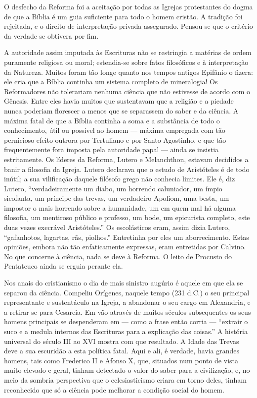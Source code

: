 \documentclass[11pt,a5paper,twoside,openany]{book}
\begin{document}
O desfecho da Reforma foi a aceitação por todas as Igrejas protestantes do dogma de que a Bíblia é um guia suficiente para todo o homem cristão. A tradição foi rejeitada, e o direito de interpretação privada assegurado. Pensou-se que o critério da verdade se obtivera por fim.

A autoridade assim imputada às Escrituras não se restringia a matérias de ordem puramente religiosa ou moral; estendia-se sobre fatos filosóficos e à interpretação da Natureza. Muitos foram tão longe quanto nos tempos antigos Epifânio o fizera: ele cria que a Bíblia continha um sistema completo de mineralogia! Os Reformadores não tolerariam nenhuma ciência que não estivesse de acordo com o Gênesis. Entre eles havia muitos que sustentavam que a religião e a piedade nunca poderiam florescer a menos que se separassem do saber e da ciência. A máxima fatal de que a Bíblia continha a soma e a substância de todo o conhecimento, útil ou possível ao homem — máxima empregada com tão pernicioso efeito outrora por Tertuliano e por Santo Agostinho, e que tão frequentemente fora imposta pela autoridade papal — ainda se insistia estritamente. Os líderes da Reforma, Lutero e Melanchthon, estavam decididos a banir a filosofia da Igreja. Lutero declarava que o estudo de Aristóteles é de todo inútil; a sua vilificação daquele filósofo grego não conhecia limites. Ele é, diz Lutero, “verdadeiramente um diabo, um horrendo caluniador, um ímpio sicofanta, um príncipe das trevas, um verdadeiro Apoliom, uma besta, um impostor o mais horrendo sobre a humanidade, um em quem mal há alguma filosofia, um mentiroso público e professo, um bode, um epicurista completo, este duas vezes execrável Aristóteles.” Os escolásticos eram, assim dizia Lutero, “gafanhotos, lagartas, rãs, piolhos.” Entretinha por eles um aborrecimento. Estas opiniões, embora não tão enfaticamente expressas, eram entretidas por Calvino. No que concerne à ciência, nada se deve à Reforma. O leito de Procusto do Pentateuco ainda se erguia perante ela.

Nos anais do cristianismo o dia de mais sinistro augúrio é aquele em que ela se separou da ciência. Compeliu Orígenes, naquele tempo (231 d.C.) o seu principal representante e sustentáculo na Igreja, a abandonar o seu cargo em Alexandria, e a retirar-se para Cesareia. Em vão através de muitos séculos subsequentes os seus homens principais se despenderam em — como a frase então corria — “extrair o suco e a medula internos das Escrituras para a explicação das coisas.” A história universal do século III ao XVI mostra com que resultado. A Idade das Trevas deve a sua escuridão a esta política fatal. Aqui e ali, é verdade, havia grandes homens, tais como Frederico II e Afonso X, que, situados num ponto de vista muito elevado e geral, tinham detectado o valor do saber para a civilização, e, no meio da sombria perspectiva que o eclesiasticismo criara em torno deles, tinham reconhecido que só a ciência pode melhorar a condição social do homem.
\end{document}
